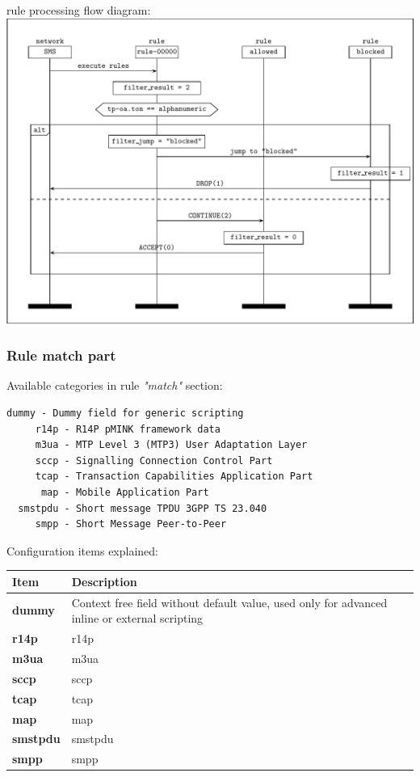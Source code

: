 \documentclass[a4paper,latin]{paper}
\begin{document}
\noindent{}\Gls{rule} processing flow diagram:\\
\includegraphics[width=\linewidth]{graphics/8_2_1.pdf}
\clearpage

\subsubsection{Rule match part}
Available categories in \gls{rule} \textit{"match"} section:
\begin{lstlisting}[style=BashInputStyle, belowskip=\baselineskip]
    dummy - Dummy field for generic scripting
     r14p - R14P pMINK framework data
     m3ua - MTP Level 3 (MTP3) User Adaptation Layer
     sccp - Signalling Connection Control Part      
     tcap - Transaction Capabilities Application Part
      map - Mobile Application Part                  
  smstpdu - Short message TPDU 3GPP TS 23.040
     smpp - Short Message Peer-to-Peer 
\end{lstlisting}
\noindent{}Configuration items explained:\\
\begin{tabularx}{\textwidth}{ | l | X |}
	\hline
	Item	 				& Description \\
	\hline
	\textbf{dummy}				& Context free field without default value, used only for advanced inline or external scripting \\
	\textbf{r14p}				& \acrfull{r14p} \\
	\textbf{m3ua}				& \acrfull{m3ua} \\
	\textbf{sccp}				& \acrfull{sccp} \\
	\textbf{tcap}				& \acrfull{tcap} \\
	\textbf{map}				& \acrfull{map} \\
	\textbf{smstpdu}			& \acrfull{smstpdu} \\
	\textbf{smpp}				& \acrfull{smpp} \\
	\hline
\end{tabularx}\\
\end{document}
